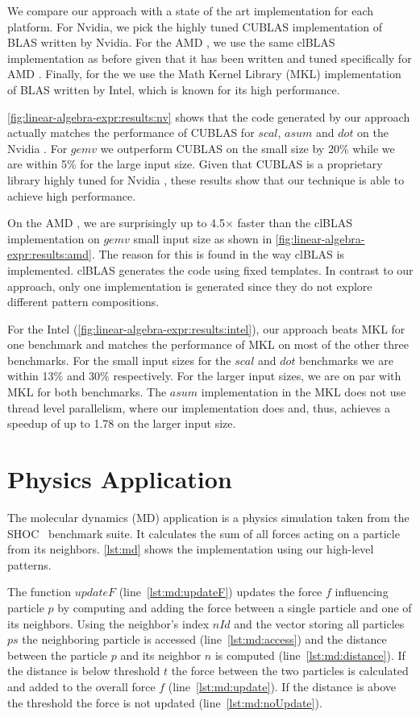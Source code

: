 We compare our approach with a state of the art implementation for each platform.
For Nvidia, we pick the highly tuned CUBLAS implementation of BLAS written by Nvidia.
For the AMD \GPU, we use the same clBLAS implementation as before given that it has been written and tuned specifically for AMD \GPUs.
Finally, for the \CPU we use the Math Kernel Library (MKL) implementation of BLAS written by Intel, which is known for its high performance.

\autoref{fig:linear-algebra-expr:results:nv} shows that the code generated by our approach actually matches the performance of CUBLAS for $scal$, $asum$ and $dot$ on the Nvidia \GPU.
For $gemv$ we outperform CUBLAS on the small size by 20\% while we are within 5\% for the large input size.
Given that CUBLAS is a proprietary library highly tuned for Nvidia \GPUs, these results show that our technique is able to achieve high performance.

On the AMD \GPU, we are surprisingly up to 4.5$\times$ faster than the clBLAS implementation on $gemv$ small input size as shown in \autoref{fig:linear-algebra-expr:results:amd}.
The reason for this is found in the way clBLAS is implemented.
clBLAS generates the \OpenCL code using fixed templates.
In contrast to our approach, only one implementation is generated since they do not explore different pattern compositions.

For the Intel \CPU (\autoref{fig:linear-algebra-expr:results:intel}), our approach beats MKL for one benchmark and matches the performance of MKL on most of the other three benchmarks.
For the small input sizes for the $scal$ and $dot$ benchmarks we are within 13\% and 30\% respectively.
For the larger input sizes, we are on par with MKL for both benchmarks.
The $asum$ implementation in the MKL does not use thread level parallelism, where our implementation does and, thus, achieves a speedup of up to 1.78 on the larger input size.


\section{Physics Application}

The molecular dynamics (MD) application is a physics simulation taken from the SHOC~\cite{DanalisMMMRSTV10} benchmark suite.
It calculates the sum of all forces acting on a particle from its neighbors.
\autoref{lst:md} shows the implementation using our high-level patterns.

The function $updateF$ (line~\ref{lst:md:updateF}) updates the force $f$ influencing particle $p$ by computing and adding the force between a single particle and one of its neighbors.
Using the neighbor's index $nId$ and the vector storing all particles $ps$ the neighboring particle is accessed (line~\ref{lst:md:access}) and the distance between the particle $p$ and its neighbor $n$ is computed (line~\ref{lst:md:distance}).
If the distance is below threshold $t$ the force between the two particles is calculated and added to the overall force $f$ (line~\ref{lst:md:update}).
If the distance is above the threshold the force is not updated (line~\ref{lst:md:noUpdate}).


